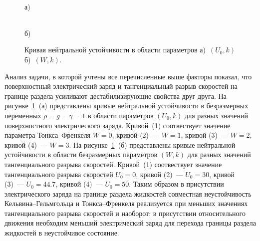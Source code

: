 \begin{figure}[ht]
	\begin{minipage}[h]{0.47\linewidth}
		 \\а) \\
	\end{minipage}
	\hfill
	\begin{minipage}[h]{0.47\linewidth}
		 \\б)
	\end{minipage}
	\label{ris:Fig5}
		\caption{Кривая нейтральной устойчивости в области параметров а)~$ \left(U_{0}, k	\right) $ б)~$ \left(W, k	\right) $.}
\end{figure}

Анализ задачи, в которой учтены все перечисленные выше факторы показал, что поверхностный электрический заряд и тангенциальный разрыв скоростей на границе раздела усиливают дестабилизирующие свойства друг друга. На рисунке~\ref{ris:Fig5}~(а) представлены кривые нейтральной устойчивости в безразмерных переменных $ \rho=g=\gamma=1 $ в области параметров $ \left(U_{0}, k	\right) $ для разных значений поверхностного электрического заряда. Кривой~(1) соотвествует значение параметра Тонкса--Френкеля $ W=0 $, кривой (2)~--- $ W=1 $, кривой (3)~--- $ W=2 $, кривой (4)~--- $ W=3 $. На рисунке~\ref{ris:Fig5}~(б) представлены кривые нейтральной устойчивости в области безразмерных параметров $ \left(W, k	\right) $ для разных значений тангенциального разрыва скоростей. Кривой~(1) соотвествует значение тангенциального разрыва скоростей $ U_{0}=0 $, кривой (2)~--- $ U_{0}=30 $, кривой (3)~--- $ U_{0}=44.7 $, кривой (4)~--- $ U_{0}=50 $. Таким образом в присутствии электрического заряда на границе раздела жидкостей совместная неустойчивость Кельвина--Гельмгольца и Тонкса--Френкеля реализуется при меньших значениях тангенциального разрыва скоростей и наоборот: в присутствии относительного движения необходим меньший электрический заряд для перехода границы раздела жидкостей в неустойчивое состояние.  

